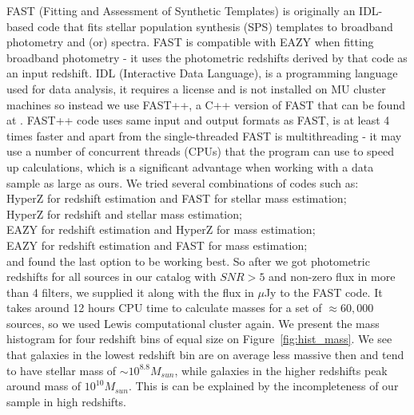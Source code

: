 FAST (Fitting and Assessment of Synthetic Templates) \citep{2018ascl.soft03008K} is originally an IDL-based code that fits stellar population synthesis (SPS) \citep{2003MNRAS.344.1000B} templates to broadband photometry and (or) spectra. FAST is compatible with EAZY when fitting broadband photometry - it uses the photometric redshifts derived by that code as an input redshift. 
IDL (Interactive Data Language), is a programming language used for data analysis, it requires a license and is not installed on MU cluster machines so instead we use FAST++, a C++ version of FAST that can be found at . FAST++ code uses same input and output formats as FAST, is at least 4 times faster and apart from the single-threaded FAST is multithreading - it may use a number of concurrent threads (CPUs) that the program can use to speed up calculations, which is a significant advantage when working with a data sample as large as ours.
We tried several combinations of codes such as:\\
HyperZ for redshift estimation and FAST for stellar mass estimation;\\
HyperZ for redshift and stellar mass estimation;\\
EAZY for redshift estimation and HyperZ for mass estimation;\\
EAZY for redshift estimation and FAST for mass estimation;\\
and found the last option to be working best. So after we got photometric redshifts for all sources in our catalog with $SNR>5$ and non-zero flux in more than 4 filters, we supplied it along with the flux in $\mu$Jy to the FAST code. It takes around 12 hours CPU time to calculate masses for a set of $\approx60,000$ sources, so we used Lewis computational cluster again.
We present the mass histogram for four redshift bins of equal size on Figure~\ref{fig:hist_mass}. We see that galaxies in the lowest redshift bin are on average less massive then and tend to have stellar mass of $\sim10^{8.8}M_{sun}$, while galaxies in the higher redshifts peak around mass of $10^{10}M_{sun}$. This is can be explained by the incompleteness of our sample in high redshifts.

